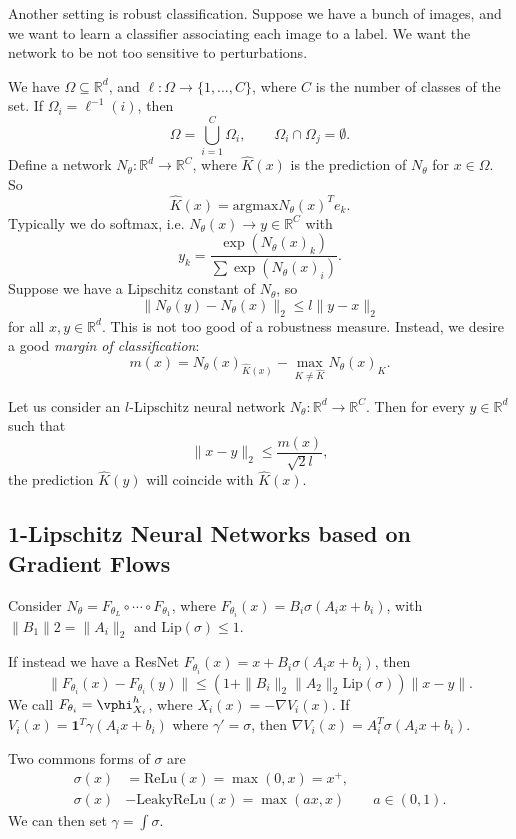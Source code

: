 \documentclass[12pt]{article}
\begin{document}
Another setting is robust classification. Suppose we have a bunch of images, and we want to learn a classifier associating each image to a label. We want the network to be not too sensitive to perturbations.

We have $\Omega \subseteq \mathbb{R}^{d}$, and $\ell : \Omega \to \{1, \ldots, C\}$, where $C$ is the number of classes of the set. If $\Omega_i = \ell^{-1}(i)$, then
\[
\Omega = \bigcup_{i = 1}^{C} \Omega_i, \qquad \Omega_i \cap \Omega_j = \emptyset.
\]
Define a network $N_\theta : \mathbb{R}^{d} \to \mathbb{R}^{C}$, where $\hat K(x)$ is the prediction of $N_\theta$ for $x \in \Omega$. So
\[
\hat K(x) = \mathrm{argmax} N_\theta(x)^{T} e_k.
\]
Typically we do softmax, i.e. $N_\theta(x) \to y \in \mathbb{R}^{C}$ with
\[
y_k = \frac{\exp (N_\theta(x)_k)}{\sum \exp (N_\theta(x)_i)}.
\]
Suppose we have a Lipschitz constant of $N_\theta$, so
\[
\|N_\theta(y) - N_\theta(x)\|_2 \leq l \|y - x\|_2
\]
for all $x, y \in \mathbb{R}^{d}$. This is not too good of a robustness measure. Instead, we desire a good \emph{margin of classification}:
\[
m(x) = N_\theta(x)_{\hat K(x)} - \max_{K \neq \hat K} N_\theta(x)_K.
\]
\begin{proposition}
	Let us consider an $l$-Lipschitz neural network $N_\theta : \mathbb{R}^{d} \to \mathbb{R}^{C}$. Then for every $y \in \mathbb{R}^{d}$ such that
	\[
	\|x - y\|_2 \leq \frac{m(x)}{\sqrt 2 l},
	\]
	the prediction $\hat K(y)$ will coincide with $\hat K(x)$.
\end{proposition}

\subsection{1-Lipschitz Neural Networks based on Gradient Flows}%
\label{sub:1lnngf}

Consider $N_\theta = F_{\theta_L} \circ \cdots \circ F_{\theta_1}$, where $F_{\theta_i}(x) = B_i \sigma(A_i x + b_i)$, with $\|B_1\|2 = \|A_i\|_2$ and $\mathrm{Lip}(\sigma) \leq 1$.

If instead we have a ResNet $F_{\theta_i}(x) = x + B_i \sigma(A_i x + b_i)$, then
\[
\|F_{\theta_i}(x) - F_{\theta_i}(y)\| \leq (1 + \|B_i\|_2 \|A_2\|_2 \mathrm{Lip}(\sigma))\|x - y\|.
\]
We call $F_{\theta_i} = \vphi^{h}_{X_i}$, where $X_i(x) = - \nabla V_i(x)$. If $V_i(x) = \mathbf{1}^{T} \gamma(A_i x + b_i)$ where $\gamma' = \sigma$, then $\nabla V_i(x) = A_i^{T} \sigma(A_i x + b_i)$.

Two commons forms of $\sigma$ are
\begin{align*}
	\sigma(x) &= \mathrm{ReLu}(x) = \max(0, x) = x^{+}, \\
	\sigma(x) &- \mathrm{LeakyReLu}(x) = \max(ax, x) \qquad a \in (0, 1).
\end{align*}
We can then set $\gamma = \int \sigma$.

\newpage

\printindex
\end{document}
